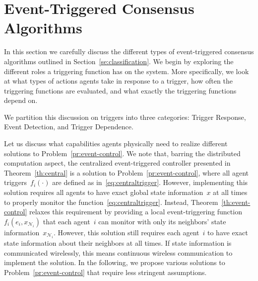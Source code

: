 \documentclass{autart}
\newcommand{\NN}{{\mathcal{N}}}
\begin{document}

\section{Event-Triggered Consensus Algorithms}\label{se:main}

In this section we carefully discuss the different types of
event-triggered consensus algorithms outlined in
Section~\ref{se:classification}. We begin by exploring the different
roles a triggering function has on the system. More specifically, we
look at what types of actions agents take in response to a trigger,
how often the triggering functions are evaluated, and what exactly the
triggering functions depend on. {We partition this discussion on
triggers into three categories: Trigger Response, Event Detection, and
Trigger Dependence. 

Let us discuss what capabilities agents physically need to realize
different solutions to Problem~\ref{pr:event-control}.  We note that,
barring the distributed computation aspect, the centralized
event-triggered controller presented in Theorem~\ref{th:central} is a
solution to Problem~\ref{pr:event-control}, where all agent
triggers~$f_i(\cdot)$ are defined as in~\eqref{eq:centraltrigger}.
However, implementing this solution requires all agents to have exact
global state information~$x$ at all times to properly monitor the
function~\eqref{eq:centraltrigger}. Instead,
Theorem~\ref{th:event-control} relaxes this requirement by providing a
local event-triggering function~$f_i(e_i,x_{\NN_i})$ that each
agent~$i$ can monitor with only its neighbors' state
information~$x_{\NN_i}$. However, this solution still requires each
agent~$i$ to have exact state information about their neighbors at all
times. If state information is communicated wirelessly, this means
continuous wireless communication to implement the solution. In the
following, we propose various solutions to
Problem~\ref{pr:event-control} that require less stringent
assumptions.  }
\end{document}
